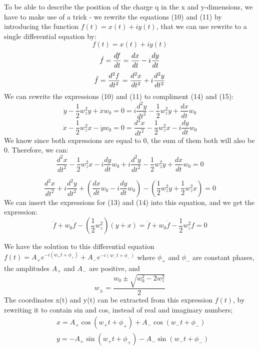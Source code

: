 \documentclass[english,notitlepage,reprint,nofootinbib,twocolumn]{article}
\begin{document}

To be able to describe the position of the charge q in the x and y-dimensions, we have to make use of a trick - we rewrite the equations (10) and (11) by introducing the function $f(t)=x(t)+iy(t)$, that we can use rewrite to a single differential equation by: 
$$f(t)=x(t)+iy(t)$$
\begin{equation}
    \dot{f}=\frac{df}{dt}=\frac{dx}{dt}-i\frac{dy}{dt} \\
\end{equation}
\begin{equation}
    \ddot{f}=\frac{d^2f}{dt^2}=\frac{d^2x}{dt^2}+i\frac{d^2y}{dt^2} \\
\end{equation}
We can rewrite the expressions (10) and (11) to compliment (14) and (15): 
$$\ddot{y} -\frac{1}{2} w_z^2y + \dot{x}w_0  = 0 = i\frac{d^2y}{dt^2}-\frac{1}{2} w_z^2y + \frac{dx}{dt}w_0  $$
$$\ddot{x} - \frac{1}{2} w_z^2x -  \dot{y}w_0 = 0 = \frac{d^2x}{dt^2}-\frac{1}{2} w_z^2x  - i\frac{dy}{dt}w_0  $$
We know since both expressions are equal to 0, the sum of them both will also be 0. Therefore, we can:  
$$\frac{d^2x}{dt^2}-\frac{1}{2} w_z^2x  - i\frac{dy}{dt}w_0 + i\frac{d^2y}{dt^2}-\frac{1}{2} w_z^2y + \frac{dx}{dt}w_0 = 0 $$

$$\frac{d^2x}{dt^2}+ i\frac{d^2y}{dt^2} +(\frac{dx}{dt}w_0- i\frac{dy}{dt}w_0) -(\frac{1}{2} w_z^2y +\frac{1}{2} w_z^2x) = 0 $$
We can insert the expressions for (13) and (14) into this equation, and we get the expression: 
$$\ddot{f} +w_0\dot{f} -(\frac{1}{2}w_z^2)(y + x) = \ddot{f} +w_0\dot{f} - \frac{1}{2}w_z^2f=0 $$

We have the solution to this differential equation 
$ f(t)=A_+e^{-i(w_+t+\phi_+)}+A_-e^{-i(w_-t+\phi_-)}$ where $\phi_+ $
and $\phi_-$ are constant phases, the amplitudes $A_+$ and $A_-$ are positive, and 
\begin{equation}
w_{\pm}=\frac{w_0 \pm \sqrt{w_0^2-2w_z^2}}{2}
\end{equation}
The coordinates x(t) and y(t) can be extracted from this expression $f(t)$, by rewriting it to contain sin and cos, instead of real and imaginary numbers; 
\begin{equation}
    \begin{split}
        & x=A_+ \cos{(w_+t+\phi_+)}+ A_-\cos{(w_-t+\phi_-)}\\
        & y=-A_+\sin{(w_+t+\phi_+)}- A_-\sin{(w_-t+\phi_-)} \\
    \end{split}
\end{equation}
\end{document}
